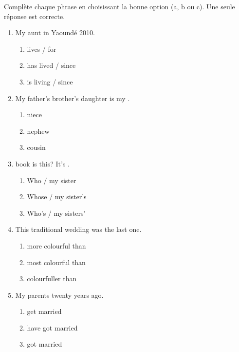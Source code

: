 \documentclass[11pt]{article}
\begin{document}
\begin{exercice}
Complète chaque phrase en choisissant la bonne option (a, b ou c). Une seule réponse est correcte.
\begin{enumerate}
    \item My aunt \underline{\hspace{2cm}} in Yaoundé \underline{\hspace{1cm}} 2010.
    \begin{enumerate}
        \item lives / for
        \item has lived / since
        \item is living / since
    \end{enumerate}
    \item My father's brother's daughter is my \underline{\hspace{2cm}}.
    \begin{enumerate}
        \item niece
        \item nephew
        \item cousin
    \end{enumerate}
    \item \underline{\hspace{1cm}} book is this? It's \underline{\hspace{1cm}}.
    \begin{enumerate}
        \item Who / my sister
        \item Whose / my sister's
        \item Who's / my sisters'
    \end{enumerate}
    \item This traditional wedding was \underline{\hspace{2cm}} the last one.
    \begin{enumerate}
        \item more colourful than
        \item most colourful than
        \item colourfuller than
    \end{enumerate}
    \item My parents \underline{\hspace{2cm}} twenty years ago.
    \begin{enumerate}
        \item get married
        \item have got married
        \item got married
    \end{enumerate}
\end{enumerate}
\end{exercice}
\end{document}
